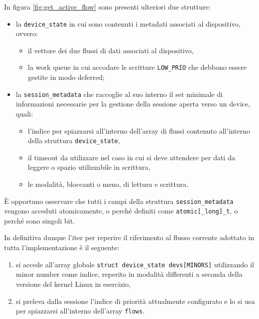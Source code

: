 \documentclass{article}
\begin{document}
In figura \ref{fig:get_active_flow} sono presenti ulteriori due strutture:
\begin{itemize}
        \item la \texttt{device\_state} in cui sono contenuti i metadati associati al dispositivo, ovvero:
                \begin{itemize}
                        \item il vettore dei due flussi di dati associati al dispositivo,
                        \item la work queue in cui accodare le scritture \texttt{LOW\_PRIO} che debbono essere gestite in modo deferred;
                \end{itemize}
        \item la \texttt{session\_metadata} che raccoglie al suo interno il set minimale di informazioni necessarie per la gestione della sessione aperta verso un device, quali:
                \begin{itemize}
                        \item l'indice per spiazzarsi all'interno dell'array di flussi contenuto all'interno della struttura \texttt{device\_state},
                        \item il timeout da utilizzare nel caso in cui si deve attendere per dati da leggere o spazio utilizzabile in scrittura,
                        \item le modalità, bloccanti o meno, di lettura e scrittura.
                \end{itemize}
\end{itemize}

È opportuno osservare che tutti i campi della struttura \texttt{session\_metadata} vengono acceduti atomicamente, o perché definiti come \texttt{atomic[\_long]\_t}, o perché sono singoli bit.

In definitiva dunque l'iter per reperire il riferimento al flusso corrente adottato in tutta l'implementazione è il seguente:
\begin{enumerate}
        \item si accede all'array globale \texttt{struct device\_state devs[MINORS]} utilizzando il minor number come indice, reperito in modalità differenti a seconda della versione del kernel Linux in esercizio,
        \item si preleva dalla sessione l'indice di priorità attualmente configurato e lo si usa per spiazzarsi all'interno dell'array \texttt{flows}.
\end{enumerate}
\end{document}
